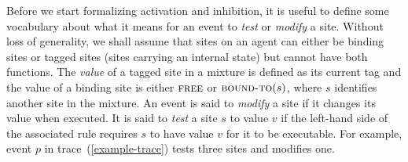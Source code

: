 Before we start formalizing activation and inhibition, it is useful to
define some vocabulary about what it means for an event to \emph{test}
or \emph{modify} a site. Without loss of generality, we shall assume
that sites on an agent can either be binding sites or tagged sites
(sites carrying an internal state) but cannot have both functions. The
\textit{value} of a tagged site in a mixture is defined as its current
tag and the value of a binding site is either $\textsc{free}$ or
$\textsc{bound-to}(s)$, where $s$ identifies another site in the
mixture.  An event is said to \emph{modify} a site if it changes its
value when executed. It is said to \emph{test} a site $s$ to value $v$
if the left-hand side of the associated rule requires $s$ to have
value $v$ for it to be executable. For example, event $p$ in
trace~(\ref{example-trace}) tests three sites and modifies one.

